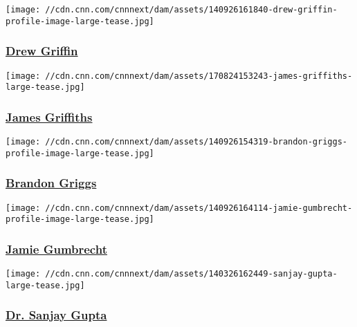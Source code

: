 \href{/profiles/drew-griffin-profile}{}

\texttt{[image: //cdn.cnn.com/cnnnext/dam/assets/140926161840-drew-griffin-profile-image-large-tease.jpg]}

\hypertarget{drew-griffin}{%
\subsubsection{\texorpdfstring{\href{/profiles/drew-griffin-profile}{Drew
Griffin}}{Drew Griffin}}\label{drew-griffin}}

\href{/profiles/james-griffiths}{}

\texttt{[image: //cdn.cnn.com/cnnnext/dam/assets/170824153243-james-griffiths-large-tease.jpg]}

\hypertarget{james-griffiths}{%
\subsubsection{\texorpdfstring{\href{/profiles/james-griffiths}{James
Griffiths}}{James Griffiths}}\label{james-griffiths}}

\href{/profiles/brandon-griggs}{}

\texttt{[image: //cdn.cnn.com/cnnnext/dam/assets/140926154319-brandon-griggs-profile-image-large-tease.jpg]}

\hypertarget{brandon-griggs}{%
\subsubsection{\texorpdfstring{\href{/profiles/brandon-griggs}{Brandon
Griggs}}{Brandon Griggs}}\label{brandon-griggs}}

\href{/profiles/jamie-gumbrecht}{}

\texttt{[image: //cdn.cnn.com/cnnnext/dam/assets/140926164114-jamie-gumbrecht-profile-image-large-tease.jpg]}

\hypertarget{jamie-gumbrecht}{%
\subsubsection{\texorpdfstring{\href{/profiles/jamie-gumbrecht}{Jamie
Gumbrecht}}{Jamie Gumbrecht}}\label{jamie-gumbrecht}}

\href{/profiles/sanjay-gupta-profile}{}

\texttt{[image: //cdn.cnn.com/cnnnext/dam/assets/140326162449-sanjay-gupta-large-tease.jpg]}

\hypertarget{dr-sanjay-gupta}{%
\subsubsection{\texorpdfstring{\href{/profiles/sanjay-gupta-profile}{Dr.
Sanjay Gupta}}{Dr. Sanjay Gupta}}\label{dr-sanjay-gupta}}

